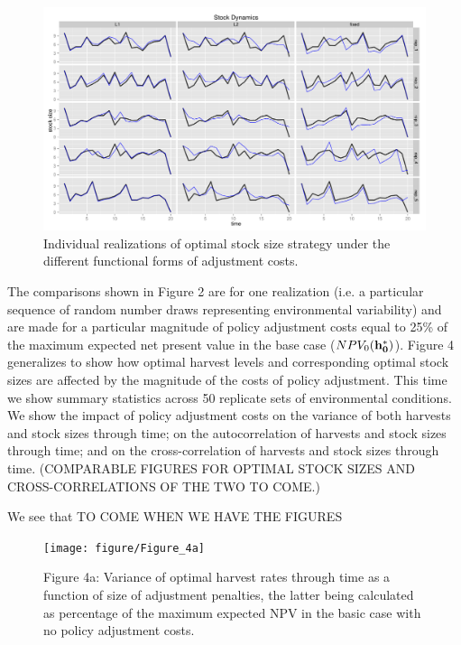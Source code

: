 \documentclass{article}\usepackage{graphicx, color}
\makeatletter
\def\maxwidth{ %
  \ifdim\Gin@nat@width>\linewidth
    \linewidth
  \else
    \Gin@nat@width
  \fi
}
\newenvironment{knitrout}{}{} %
\makeatother
\begin{document}
\begin{figure}
\begin{knitrout}
\color{fgcolor}
\includegraphics[width=\maxwidth]{figure/Figure_3} 

\end{knitrout}

  \caption{Individual realizations of optimal stock size strategy under the different functional forms of adjustment costs.}
\end{figure}



The comparisons shown in Figure 2 are for one realization (i.e. a particular sequence of random number draws representing environmental variability) and are made for a particular magnitude of policy adjustment costs equal to 25\% of the maximum expected net present value in the base case ($NPV_0({\bf h_0^*})$). Figure 4 generalizes to show how optimal harvest levels and corresponding optimal stock sizes are affected by the magnitude of the costs of policy adjustment. This time we show summary statistics across 50 replicate sets of environmental conditions. We show the impact of policy adjustment costs on the variance of both harvests and stock sizes through time; on the autocorrelation of harvests and stock sizes through time; and on the cross-correlation of harvests and stock sizes through time.  (COMPARABLE FIGURES FOR OPTIMAL STOCK SIZES AND CROSS-CORRELATIONS OF THE TWO TO COME.)

We see that TO COME WHEN WE HAVE THE FIGURES

\begin{figure}
\begin{knitrout}
\color{fgcolor}
\texttt{[image: figure/Figure\_4a]} 

\end{knitrout}


\caption*{Figure 4a: Variance of optimal harvest rates through time as a function of size of adjustment penalties, the latter being calculated as percentage of the maximum expected NPV in the basic case with no policy adjustment costs. }
\end{figure}
\end{document}
